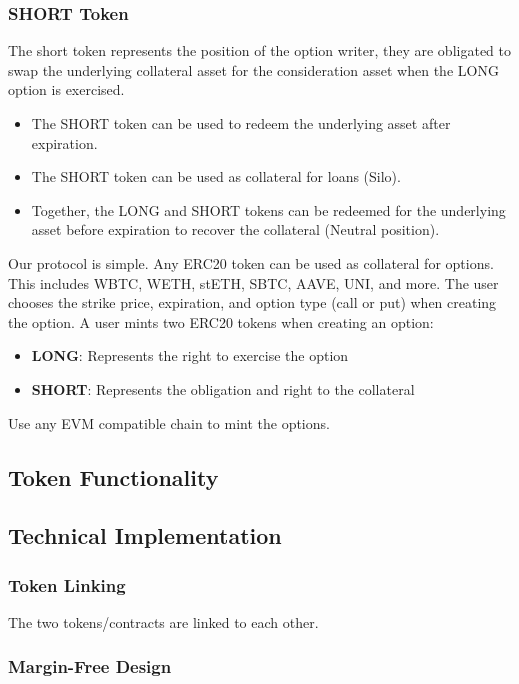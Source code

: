 \documentclass[%
 reprint,
 amsmath,amssymb,
 aps,
]{revtex4-2}
\begin{document}
\subsubsection{SHORT Token}

The short token represents the position of the option writer, they are
obligated to swap the underlying collateral asset for the consideration
asset when the LONG option is exercised.
\begin{itemize}
\item The SHORT token can be used
to redeem the underlying asset after expiration.
\item The SHORT token can
be used as collateral for loans (Silo).
\item Together, the LONG and SHORT
tokens can be redeemed for the underlying asset before expiration to
recover the collateral (Neutral position).
\end{itemize}


Our protocol is simple. Any ERC20 token can be used as collateral for
options. This includes WBTC, WETH, stETH, SBTC, AAVE, UNI, and more. The
user chooses the strike price, expiration, and option type (call or put)
when creating the option. A user mints two ERC20 tokens when creating an
option:
\begin{itemize}
\item \textbf{LONG}: Represents the right to exercise the option
\item \textbf{SHORT}: Represents the obligation and right to the collateral
\end{itemize}

Use any EVM compatible chain to mint the options.

\subsection{Token Functionality}


\subsection{Technical Implementation}

\subsubsection{Token Linking}

The two tokens/contracts are linked to each other. 

\subsubsection{Margin-Free Design}
\end{document}
